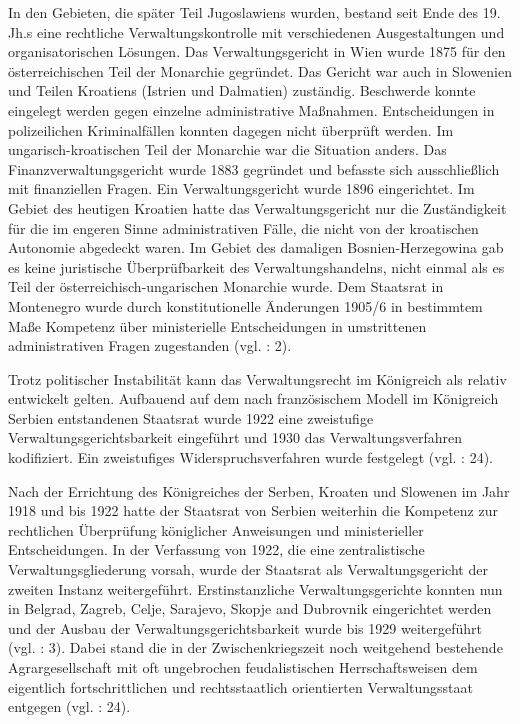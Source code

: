 In den Gebieten, die später Teil Jugoslawiens wurden, bestand seit Ende des 19. Jh.s eine rechtliche Verwaltungskontrolle mit verschiedenen Ausgestaltungen und organisatorischen Lösungen. Das Verwaltungsgericht in Wien wurde 1875 für den österreichischen Teil der Monarchie gegründet. Das Gericht war auch in Slowenien und Teilen Kroatiens (Istrien und Dalmatien) zuständig. Beschwerde konnte eingelegt werden gegen einzelne administrative Maßnahmen. Entscheidungen in polizeilichen Kriminalfällen konnten dagegen nicht überprüft werden. Im ungarisch-kroatischen Teil der Monarchie war die Situation anders. Das Finanzverwaltungsgericht wurde 1883 gegründet und befasste sich ausschließlich mit finanziellen Fragen. Ein Verwaltungsgericht wurde 1896 eingerichtet. Im Gebiet des heutigen Kroatien hatte das Verwaltungsgericht nur die Zuständigkeit für die im engeren Sinne administrativen Fälle, die nicht von der kroatischen Autonomie abgedeckt waren. Im Gebiet des damaligen Bosnien-Herzegowina gab es keine juristische Überprüfbarkeit des Verwaltungshandelns, nicht einmal als es Teil der österreichisch-ungarischen Monarchie wurde. Dem Staatsrat in Montenegro wurde durch konstitutionelle Änderungen 1905/6 in bestimmtem Maße Kompetenz über ministerielle Entscheidungen in umstrittenen administrativen Fragen zugestanden (vgl. \cite{kopric}: 2).\par
Trotz politischer Instabilität kann das Verwaltungsrecht im Königreich als relativ entwickelt gelten. Aufbauend auf dem nach französischem Modell im Königreich Serbien entstandenen Staatsrat wurde 1922 eine zweistufige Verwaltungsgerichtsbarkeit eingeführt und 1930 das Verwaltungsverfahren kodifiziert. Ein zweistufiges Widerspruchsverfahren wurde festgelegt (vgl. \cite{lucht}: 24).
\par
Nach der Errichtung des Königreiches der Serben, Kroaten und Slowenen im Jahr 1918 und bis 1922 hatte der Staatsrat von Serbien weiterhin die Kompetenz zur rechtlichen Überprüfung königlicher Anweisungen und ministerieller Entscheidungen. In der Verfassung von 1922, die eine zentralistische Verwaltungsgliederung vorsah, wurde der Staatsrat als Verwaltungsgericht der zweiten Instanz weitergeführt. Erstinstanzliche Verwaltungsgerichte konnten nun in Belgrad, Zagreb, Celje, Sarajevo, Skopje and Dubrovnik eingerichtet werden und der Ausbau der Verwaltungsgerichtsbarkeit wurde bis 1929 weitergeführt (vgl. \cite{kopric}: 3). Dabei stand die in der Zwischenkriegszeit noch weitgehend bestehende Agrargesellschaft mit oft ungebrochen feudalistischen Herrschaftsweisen dem eigentlich fortschrittlichen und rechtsstaatlich orientierten Verwaltungsstaat entgegen (vgl. \cite{lucht}: 24).

